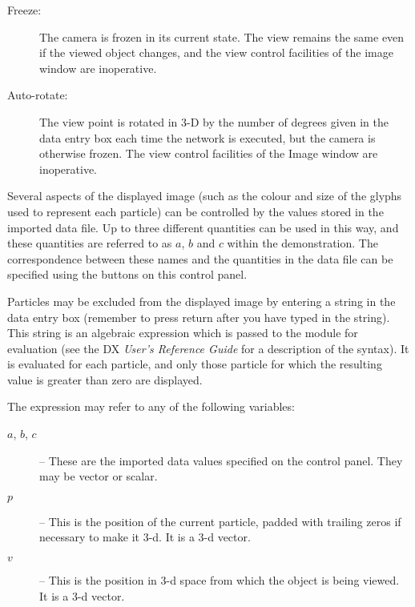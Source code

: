 \begin{description}
\begin{description}
\item[Freeze:]
The camera is frozen in its current state. The view remains the same even
if the viewed object changes, and the view control facilities of the
image window are inoperative.

\item[Auto-rotate:]
The view point is rotated in 3-D by the number of degrees given in the
 data entry box each time the network is executed, but
the camera is otherwise frozen. The view control facilities of the
Image window are inoperative.

\end{description}

Several aspects of the displayed image (such as the colour and size of
the glyphs used to represent each particle) can be controlled by the
values stored in the imported data file. Up to three different quantities
can be used in this way, and these quantities are referred to as $a$, $b$
and $c$ within the demonstration. The correspondence between these names
and the quantities in the data file can be specified using the buttons on
this control panel.

Particles may be excluded from the displayed image by entering a string
in the  data entry box (remember to press
return after you have typed in the string). This string is an
algebraic expression which is passed to the  module for
evaluation (see the DX {\em User's Reference Guide} for a description of the
syntax). It is evaluated for each particle, and only those particle for
which the resulting value is greater than zero are displayed.

The expression may refer to any of the following variables:

\begin{description}

\item[$a$, $b$, $c$ ] --
These are the imported data values specified on the  control panel. They may be vector or scalar.

\item[$p$ ] --
This is the position of the current particle, padded with trailing zeros
if necessary to make it 3-d. It is a 3-d vector.

\item[$v$ ] --
This is the position in 3-d space from which the object is being viewed.
It is a 3-d vector.


\end{description}
\end{description}
